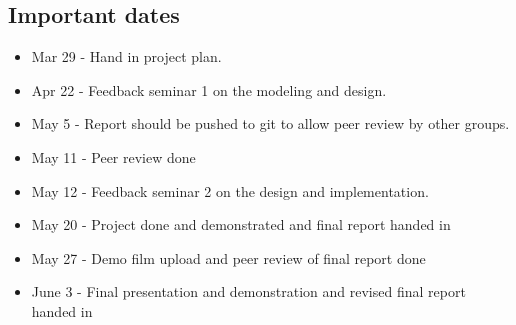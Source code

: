 \documentclass{article}
\begin{document}
\subsection{Important dates}
    \begin{itemize}
        \item Mar 29 -  Hand in project plan.
        \item Apr 22 - Feedback seminar 1 on the modeling and design.
        \item May 5 - Report should be pushed to git to allow peer review by other groups.
        \item May 11 - Peer review done
        \item May 12 - Feedback seminar 2 on the design and implementation.
        \item May 20 - Project done and demonstrated and final report handed in
        \item May 27 - Demo film upload and peer review of final report done
        \item June 3 - Final presentation and demonstration and revised final report handed in
    \end{itemize}

\end{document}
